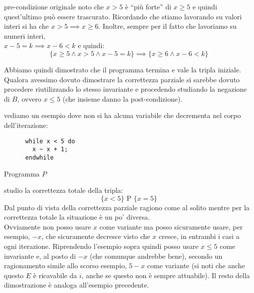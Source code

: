 \begin{esempio}
\begin{enumerate}
				      						      pre-condizione originale noto che $x>5$ è ``più forte'' di $x\geq 5$ e quindi
				      						      quest'ultimo può essere trascurato. Ricordando che stiamo lavorando su
				      						      valori interi si ha che $x>5\implies x\geq 6$. Inoltre, sempre per il fatto
				      						      che lavoriamo su numeri interi, \\
				      						      $x-5=k\implies x-6<k$ e quindi:
				      						      \[\{x\geq 5\land x>5\land x-5=k\}\implies \{x\geq 6\land x-6 < k\}\]
				      					\end{enumerate}
				      					Abbiamo quindi dimostrato che il programma termina e vale la tripla
				      					iniziale.\\
				      					Qualora avessimo dovuto dimostrare la correttezza parziale si sarebbe dovuto
				      					procedere riutilizzando lo stesso invariante e procedendo studiando la
				      					negazione di $B$, ovvero $x\leq 5$ (che insieme danno la post-condizione).
				      				\end{esempio}
				      				\begin{esempio}
				      					vediamo un esempio dove non si ha alcuna variabile che decrementa nel corpo
				      					dell'iterazione:
				      					\begin{listing}[H]
				      						\begin{lstlisting}
      while x < 5 do
        x ~ x + 1;
      endwhile  
				      						\end{lstlisting}
				      						\caption{Programma $P$}
				      						\label{E:ti}
				      					\end{listing}
				      					studio la correttezza totale della tripla:
				      					\[\{x<5\}\mbox{ P }\{x=5\}\]
				      					Dal punto di vista della correttezza parziale ragiono come al solito mentre
				      					per la correttezza totale la situazione è un po' diversa.\\
				      					Ovviamente non posso usare $x$ come variante ma posso sicuramente usare, per
				      					esempio, $-x$, che sicuramente decresce visto che $x$ cresce, in entrambi i
				      					casi a ogni iterazione. Riprendendo l'esempio sopra quindi posso usare $x\leq
				      					5$ come invariante e, al posto di $-x$ (che comunque andrebbe bene), secondo un
				      					ragionamento simile allo scorso esempio, $5-x$ come variante (si noti che
				      					anche questo $E$ è ricavabile da $i$, anche se questo non è sempre attuabile).
				      					Il resto della dimostrazione è analoga all'esempio precedente.
				      				\end{esempio}
